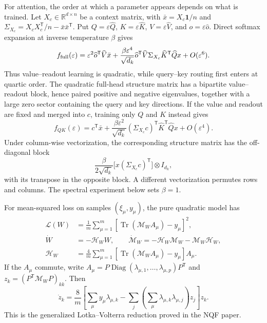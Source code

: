 \documentclass[11pt,a4paper]{article}
\theoremstyle{definition}
\newcommand{\R}{\mathbb R}
\newcommand{\T}{\mathsf T}
\newcommand{\one}{\bm 1}
\begin{document}
For attention, the order at which a parameter appears depends on what is trained.
Let $X_c\in\R^{d\times n}$ be a context matrix, with
$\bar x=X_c\one/n$ and
$\Sigma_{X_c}=X_cX_c^{\T}/n-\bar x\bar x^{\T}$.  Put
$Q=\varepsilon\widehat Q$, $K=\varepsilon\widehat K$,
$V=\varepsilon\widehat V$, and $o=\varepsilon\widehat o$.  Direct softmax expansion
at inverse temperature $\beta$ gives
\begin{equation}
 f_{\rm full}(\varepsilon)
 =\varepsilon^2\widehat o^{\T}\widehat V\bar x
 +\frac{\beta\varepsilon^4}{\sqrt{d_k}}\widehat o^{\T}\widehat V
 \Sigma_{X_c}\widehat K^{\T}\widehat Qx+O(\varepsilon^6).
 \label{eq:full-attention-expansion}
\end{equation}
Thus value--readout learning is quadratic, while query--key routing first enters at
quartic order.  The quadratic full-head structure matrix has a bipartite
value--readout block, hence paired positive and negative eigenvalues, together with a
large zero sector containing the query and key directions.  If the value and readout
are fixed and merged into $c$, training only
$Q$ and $K$ instead gives
\begin{equation}
 f_{QK}(\varepsilon)=c^{\T}\bar x+
 \frac{\beta\varepsilon^2}{\sqrt{d_k}}
 (\Sigma_{X_c}c)^{\T}\widehat K^{\T}\widehat Qx+O(\varepsilon^4).
 \label{eq:qk-attention-expansion}
\end{equation}
Under column-wise vectorization, the corresponding structure matrix has the
off-diagonal block
\[
 \frac{\beta}{2\sqrt{d_k}}
 \bigl[x(\Sigma_{X_c}c)^{\T}\bigr]\otimes I_{d_k},
\]
with its transpose in the opposite block.  A different vectorization permutes rows
and columns.  The spectral experiment below sets $\beta=1$.

For mean-squared loss on samples $(\xi_\mu,y_\mu)$, the pure quadratic model has
\begin{align}
 \mathcal L(W)&=\frac1m\sum_{\mu=1}^m
 \left[\operatorname{Tr}(\mathcal M_WA_\mu)-y_\mu\right]^2,\\
 \dot W&=-\mathcal H_W W,\qquad
 \dot{\mathcal M}_W=-\mathcal H_W\mathcal M_W-\mathcal M_W\mathcal H_W,
 \label{eq:nqf-matrix-flow}\\
 \mathcal H_W&=\frac4m\sum_{\mu=1}^m
 \left[\operatorname{Tr}(\mathcal M_WA_\mu)-y_\mu\right]A_\mu .
\end{align}
If the $A_\mu$ commute, write
$A_\mu=P\operatorname{Diag}(\lambda_{\mu,1},\ldots,\lambda_{\mu,p})P^{\T}$ and
$z_k=(P^{\T}\mathcal M_WP)_{kk}$.  Then
\begin{equation}
 \dot z_k=\frac8m\left[
 \sum_\mu y_\mu\lambda_{\mu,k}
 -\sum_j\left(\sum_\mu\lambda_{\mu,k}\lambda_{\mu,j}\right)z_j
 \right]z_k.
 \label{eq:nqf-glv}
\end{equation}
This is the generalized Lotka--Volterra reduction proved in the NQF paper.
\end{document}
